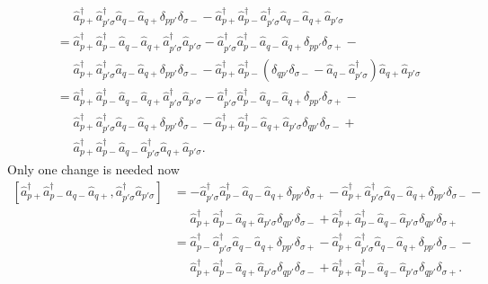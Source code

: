 \documentclass[a4paper,11pt,twoside]{article}
\begin{document}
\begin{align*}
&\quad\,\,
\hat a_{p+}^\dagger \hat a_{p'\sigma}^\dagger \hat a_{q-} \hat a_{q+} \delta_{pp'} \delta_{\sigma-} -
\hat a_{p+}^\dagger \hat a_{p-}^\dagger \hat a_{p'\sigma}^\dagger \hat a_{q-} \hat a_{q+} \hat a_{p'\sigma} \\
%
&= \hat a_{p+}^\dagger \hat a_{p-}^\dagger \hat a_{q-} \hat a_{q+} \hat a_{p'\sigma}^\dagger \hat a_{p'\sigma} -
\hat a_{p'\sigma}^\dagger \hat a_{p-}^\dagger \hat a_{q-} \hat a_{q+} \delta_{pp'} \delta_{\sigma+} - \\
&\quad\,\,
\hat a_{p+}^\dagger \hat a_{p'\sigma}^\dagger \hat a_{q-} \hat a_{q+} \delta_{pp'} \delta_{\sigma-} -
\hat a_{p+}^\dagger \hat a_{p-}^\dagger \left( \delta_{qp'} \delta_{\sigma-} - \hat a_{q-} \hat a_{p'\sigma}^\dagger \right) \hat a_{q+} \hat a_{p'\sigma} \\
%
&= \hat a_{p+}^\dagger \hat a_{p-}^\dagger \hat a_{q-} \hat a_{q+} \hat a_{p'\sigma}^\dagger \hat a_{p'\sigma} -
\hat a_{p'\sigma}^\dagger \hat a_{p-}^\dagger \hat a_{q-} \hat a_{q+} \delta_{pp'} \delta_{\sigma+} - \\
&\quad\,\,
\hat a_{p+}^\dagger \hat a_{p'\sigma}^\dagger \hat a_{q-} \hat a_{q+} \delta_{pp'} \delta_{\sigma-} -
\hat a_{p+}^\dagger \hat a_{p-}^\dagger \hat a_{q+} \hat a_{p'\sigma} \delta_{qp'} \delta_{\sigma-} + \\
&\quad\,\,
\hat a_{p+}^\dagger \hat a_{p-}^\dagger \hat a_{q-} \hat a_{p'\sigma}^\dagger \hat a_{q+} \hat a_{p'\sigma} .
\end{align*}
%
Only one change is needed now
\begin{align*}
\left[ \hat a_{p+}^\dagger \hat a_{p-}^\dagger \hat a_{q-} \hat a_{q+}, \hat a_{p'\sigma}^\dagger \hat a_{p'\sigma} \right]
%
&= - \hat a_{p'\sigma}^\dagger \hat a_{p-}^\dagger \hat a_{q-} \hat a_{q+} \delta_{pp'} \delta_{\sigma+} -
\hat a_{p+}^\dagger \hat a_{p'\sigma}^\dagger \hat a_{q-} \hat a_{q+} \delta_{pp'} \delta_{\sigma-} - \\
&\quad\,\,
\hat a_{p+}^\dagger \hat a_{p-}^\dagger \hat a_{q+} \hat a_{p'\sigma} \delta_{qp'} \delta_{\sigma-} +
\hat a_{p+}^\dagger \hat a_{p-}^\dagger \hat a_{q-} \hat a_{p'\sigma} \delta_{qp'} \delta_{\sigma+} \\
%
&= \hat a_{p-}^\dagger \hat a_{p'\sigma}^\dagger \hat a_{q-} \hat a_{q+} \delta_{pp'} \delta_{\sigma+} -
\hat a_{p+}^\dagger \hat a_{p'\sigma}^\dagger \hat a_{q-} \hat a_{q+} \delta_{pp'} \delta_{\sigma-} - \\
&\quad\,\,
\hat a_{p+}^\dagger \hat a_{p-}^\dagger \hat a_{q+} \hat a_{p'\sigma} \delta_{qp'} \delta_{\sigma-} +
\hat a_{p+}^\dagger \hat a_{p-}^\dagger \hat a_{q-} \hat a_{p'\sigma} \delta_{qp'} \delta_{\sigma+} .
\end{align*}
\end{document}

